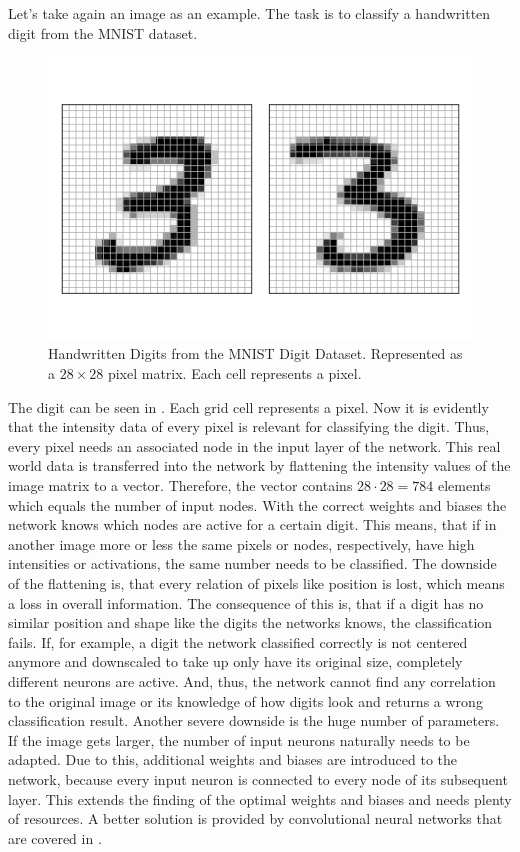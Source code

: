 Let's take again an image as an example.
The task is to classify a handwritten digit from the MNIST dataset\cite{Lecun98}.
\begin{figure}
	\centering
	\includegraphics[width=.8\textwidth]{images/mnist-digit}
	\caption[Handwritten Digits from the MNIST Digit Dataset]{Handwritten Digits from the MNIST Digit Dataset. Represented as a $28 \times 28$ pixel matrix. Each cell represents a pixel.}
	\label{fig:mnist-digit}
\end{figure}
The digit can be seen in .
Each grid cell represents a pixel.
Now it is evidently that the intensity data of every pixel is relevant for classifying the digit.
Thus, every pixel needs an associated node in the input layer of the network.
This real world data is transferred into the network by flattening the intensity values of the image matrix to a vector.
Therefore, the vector contains $28 \cdot 28 = 784$ elements which equals the number of input nodes.
With the correct weights and biases the network knows which nodes are active for a certain digit.
This means, that if in another image more or less the same pixels or nodes, respectively, have high intensities or activations, the same number needs to be classified.
The downside of the flattening is, that every relation of pixels like position is lost, which means a loss in overall information.
The consequence of this is, that if a digit has no similar position and shape like the digits the networks knows, the classification fails.
If, for example, a digit the network classified correctly is not centered anymore and downscaled to take up only have its original size, completely different neurons are active.
And, thus, the network cannot find any correlation to the original image or its knowledge of how digits look and returns a wrong classification result.
Another severe downside is the huge number of parameters.
If the image gets larger, the number of input neurons naturally needs to be adapted.
Due to this, additional weights and biases are introduced to the network, because every input neuron is connected to every node of its subsequent layer.
This extends the finding of the optimal weights and biases and needs plenty of resources.
A better solution is provided by convolutional neural networks that are covered in .
